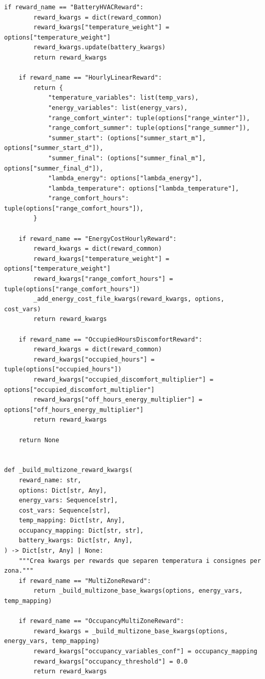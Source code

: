 \documentclass[10pt,a4paper]{article}
\begin{document}
\begin{lstlisting}[style=studioPython,caption={backend/entrenar\_agent\_rewards.py},label={lst:backend-entrenar-agent-rewards-py}]
    if reward_name == "BatteryHVACReward":
        reward_kwargs = dict(reward_common)
        reward_kwargs["temperature_weight"] = options["temperature_weight"]
        reward_kwargs.update(battery_kwargs)
        return reward_kwargs

    if reward_name == "HourlyLinearReward":
        return {
            "temperature_variables": list(temp_vars),
            "energy_variables": list(energy_vars),
            "range_comfort_winter": tuple(options["range_winter"]),
            "range_comfort_summer": tuple(options["range_summer"]),
            "summer_start": (options["summer_start_m"], options["summer_start_d"]),
            "summer_final": (options["summer_final_m"], options["summer_final_d"]),
            "lambda_energy": options["lambda_energy"],
            "lambda_temperature": options["lambda_temperature"],
            "range_comfort_hours": tuple(options["range_comfort_hours"]),
        }

    if reward_name == "EnergyCostHourlyReward":
        reward_kwargs = dict(reward_common)
        reward_kwargs["temperature_weight"] = options["temperature_weight"]
        reward_kwargs["range_comfort_hours"] = tuple(options["range_comfort_hours"])
        _add_energy_cost_file_kwargs(reward_kwargs, options, cost_vars)
        return reward_kwargs

    if reward_name == "OccupiedHoursDiscomfortReward":
        reward_kwargs = dict(reward_common)
        reward_kwargs["occupied_hours"] = tuple(options["occupied_hours"])
        reward_kwargs["occupied_discomfort_multiplier"] = options["occupied_discomfort_multiplier"]
        reward_kwargs["off_hours_energy_multiplier"] = options["off_hours_energy_multiplier"]
        return reward_kwargs

    return None


def _build_multizone_reward_kwargs(
    reward_name: str,
    options: Dict[str, Any],
    energy_vars: Sequence[str],
    cost_vars: Sequence[str],
    temp_mapping: Dict[str, Any],
    occupancy_mapping: Dict[str, str],
    battery_kwargs: Dict[str, Any],
) -> Dict[str, Any] | None:
    """Crea kwargs per rewards que separen temperatura i consignes per zona."""
    if reward_name == "MultiZoneReward":
        return _build_multizone_base_kwargs(options, energy_vars, temp_mapping)

    if reward_name == "OccupancyMultiZoneReward":
        reward_kwargs = _build_multizone_base_kwargs(options, energy_vars, temp_mapping)
        reward_kwargs["occupancy_variables_conf"] = occupancy_mapping
        reward_kwargs["occupancy_threshold"] = 0.0
        return reward_kwargs


\end{lstlisting}
\end{document}
